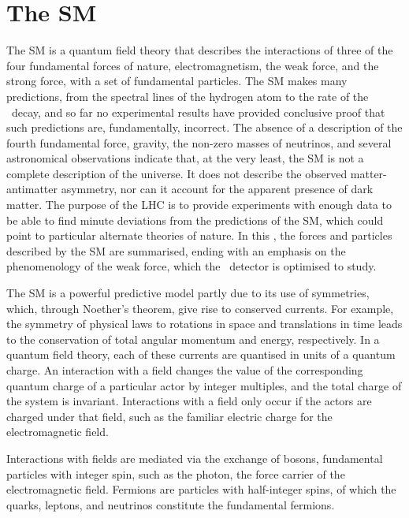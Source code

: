 \chapter{The \acl{SM}}
\label{chap:intro:sm}

The \acf{SM} is a quantum field theory that describes the interactions of three 
of the four fundamental forces of nature, electromagnetism, the weak force, and 
the strong force, with a set of fundamental particles.
The \ac{SM} makes many predictions, from the spectral lines of the hydrogen  
atom to the rate of the \BsTomumu\ decay, and so far no experimental results 
have provided conclusive proof that such predictions are, fundamentally, 
incorrect.
The absence of a description of the fourth fundamental force, gravity, the 
non-zero masses of neutrinos, and several astronomical observations indicate 
that, at the very least, the \ac{SM} is not a complete description of the 
universe.
It does not describe the observed matter-antimatter asymmetry, nor can it 
account for the apparent presence of dark matter.
The purpose of the \ac{LHC} is to provide experiments with enough data to be 
able to find minute deviations from the predictions of the \ac{SM}, which could point to particular alternate theories of nature.
In this , the forces and particles described by the 
\ac{SM} are summarised, ending with an emphasis on the phenomenology of the 
weak force, which the \lhcb\ detector is optimised to study.

The \ac{SM} is a powerful predictive model partly due to its use of symmetries, which, through Noether's theorem, give rise to conserved currents.
For example, the symmetry of physical laws to rotations in space and 
translations in time leads to the conservation of total angular momentum and energy, 
respectively.
In a quantum field theory, each of these currents are quantised in units of a 
quantum charge.
An interaction with a field changes the value of the corresponding quantum 
charge of a particular actor by integer multiples, and the total charge of the 
system is invariant.
Interactions with a field only occur if the actors are charged under that 
field, such as the familiar electric charge for the electromagnetic field.

Interactions with fields are mediated via the exchange of bosons, fundamental 
particles with integer spin, such as the photon, the force carrier of the 
electromagnetic field.
Fermions are particles with half-integer spins, of which the quarks, leptons, 
and neutrinos constitute the fundamental fermions.

